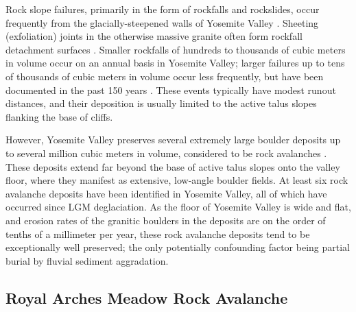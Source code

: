 \documentclass[utf8]{frontiersSCNS}
\begin{document}
Rock slope failures, primarily in the form of rockfalls and rockslides, occur frequently from the glacially-steepened walls of Yosemite Valley \citep{stock2013historical}.  Sheeting (exfoliation) joints in the otherwise massive granite often form rockfall detachment surfaces \citep[e.g.][]{stock2012progressive}.  Smaller rockfalls of hundreds to thousands of cubic meters in volume occur on an annual basis in Yosemite Valley; larger failures up to tens of thousands of cubic meters in volume occur less frequently, but have been documented in the past 150 years \citep{wieczorek2000unusual, stock2013historical, guerin2020quantifying,  zimmer2012rock}.  These events typically have modest runout distances, and their deposition is usually limited to the active talus slopes flanking the base of cliffs.  

However, Yosemite Valley preserves several extremely large boulder deposits up to several million cubic meters in volume, considered to be rock avalanches \citep{matthes1930geologic, wieczorek1999rock, wieczorek2002catastrophic, stock2010catastrophic}.  These deposits extend far beyond the base of active talus slopes onto the valley floor, where they manifest as extensive, low-angle boulder fields.  At least six rock avalanche deposits have been identified in Yosemite Valley, all of which have occurred since LGM deglaciation.  As the floor of Yosemite Valley is wide and flat, and erosion rates of the granitic boulders in the deposits are on the order of tenths of a millimeter per year, these rock avalanche deposits tend to be exceptionally well preserved; the only potentially confounding factor being partial burial by fluvial sediment aggradation.



\subsection{Royal Arches Meadow Rock Avalanche}
\end{document}
